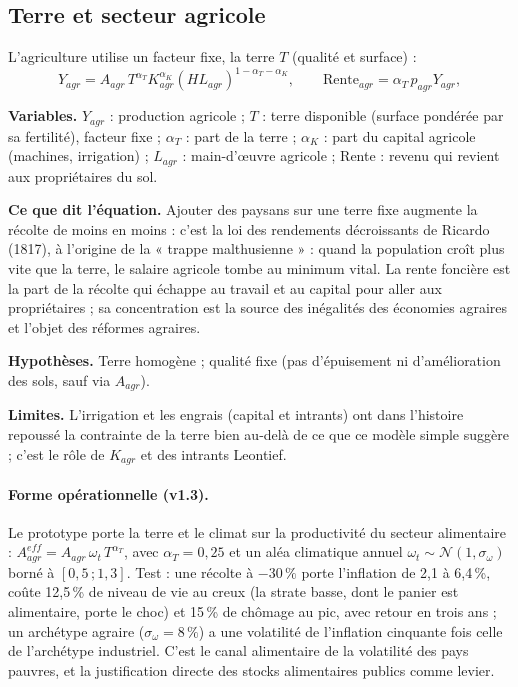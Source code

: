 \documentclass[11pt,a4paper]{article}
\newcommand{\variables}{\par\noindent\textbf{Variables.} }
\newcommand{\sens}{\par\noindent\textbf{Ce que dit l'équation.} }
\newcommand{\hyp}{\par\noindent\textbf{Hypothèses.} }
\newcommand{\limites}{\par\noindent\textbf{Limites.} }
\begin{document}
\subsection{Terre et secteur agricole}
L'agriculture utilise un facteur fixe, la terre $T$ (qualité et surface) :
\begin{equation}
Y_{agr} = A_{agr}\, T^{\alpha_T} K_{agr}^{\alpha_K} (H L_{agr})^{1-\alpha_T-\alpha_K}, \qquad
\text{Rente}_{agr} = \alpha_T\, p_{agr} Y_{agr},
\label{eq:agr}
\end{equation}
\begin{lecture}
\variables $Y_{agr}$ : production agricole ; $T$ : terre disponible (surface pondérée par sa fertilité), facteur fixe ; $\alpha_T$ : part de la terre ; $\alpha_K$ : part du capital agricole (machines, irrigation) ; $L_{agr}$ : main-d'œuvre agricole ; Rente : revenu qui revient aux propriétaires du sol.
\sens Ajouter des paysans sur une terre fixe augmente la récolte de moins en moins : c'est la loi des rendements décroissants de Ricardo (1817), à l'origine de la « trappe malthusienne » : quand la population croît plus vite que la terre, le salaire agricole tombe au minimum vital. La rente foncière est la part de la récolte qui échappe au travail et au capital pour aller aux propriétaires ; sa concentration est la source des inégalités des économies agraires et l'objet des réformes agraires.
\hyp Terre homogène ; qualité fixe (pas d'épuisement ni d'amélioration des sols, sauf via $A_{agr}$).
\limites L'irrigation et les engrais (capital et intrants) ont dans l'histoire repoussé la contrainte de la terre bien au-delà de ce que ce modèle simple suggère ; c'est le rôle de $K_{agr}$ et des intrants Leontief.
\paragraph{Forme opérationnelle (v1.3).} Le prototype porte la terre et le climat sur la productivité du secteur alimentaire : $A^{eff}_{agr}=A_{agr}\,\omega_t\,T^{\alpha_T}$, avec $\alpha_T=0{,}25$ et un aléa climatique annuel $\omega_t\sim\mathcal N(1,\sigma_\omega)$ borné à $[0{,}5\,;1{,}3]$. Test : une récolte à $-30\,\%$ porte l'inflation de 2,1 à 6,4\,\%, coûte 12,5\,\% de niveau de vie au creux (la strate basse, dont le panier est alimentaire, porte le choc) et 15\,\% de chômage au pic, avec retour en trois ans ; un archétype agraire ($\sigma_\omega=8\,\%$) a une volatilité de l'inflation cinquante fois celle de l'archétype industriel. C'est le canal alimentaire de la volatilité des pays pauvres, et la justification directe des stocks alimentaires publics comme levier.
\end{lecture}
\end{document}
